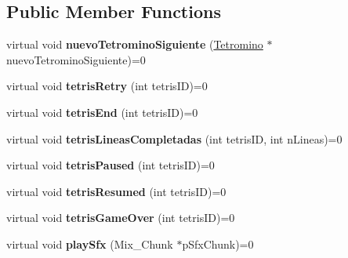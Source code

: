 \subsection*{Public Member Functions}
\begin{DoxyCompactItemize}
\item 
virtual void {\bfseries nuevo\+Tetromino\+Siguiente} (\hyperlink{class_tetromino}{Tetromino} $\ast$nuevo\+Tetromino\+Siguiente)=0\hypertarget{class_interfaz_juego_tetris_a9b27aa0041ec81b9c4dda8539fe21385}{}\label{class_interfaz_juego_tetris_a9b27aa0041ec81b9c4dda8539fe21385}

\item 
virtual void {\bfseries tetris\+Retry} (int tetris\+ID)=0\hypertarget{class_interfaz_juego_tetris_a8fd933b642725742a4f5d9b035e0f8ec}{}\label{class_interfaz_juego_tetris_a8fd933b642725742a4f5d9b035e0f8ec}

\item 
virtual void {\bfseries tetris\+End} (int tetris\+ID)=0\hypertarget{class_interfaz_juego_tetris_aee4fc00412f8d4dfffd5f580ab8e0817}{}\label{class_interfaz_juego_tetris_aee4fc00412f8d4dfffd5f580ab8e0817}

\item 
virtual void {\bfseries tetris\+Lineas\+Completadas} (int tetris\+ID, int n\+Lineas)=0\hypertarget{class_interfaz_juego_tetris_a9e11a199a7615f034d8be30eeedc6f68}{}\label{class_interfaz_juego_tetris_a9e11a199a7615f034d8be30eeedc6f68}

\item 
virtual void {\bfseries tetris\+Paused} (int tetris\+ID)=0\hypertarget{class_interfaz_juego_tetris_ad5370760fceffca5e71a9ed651baf9d5}{}\label{class_interfaz_juego_tetris_ad5370760fceffca5e71a9ed651baf9d5}

\item 
virtual void {\bfseries tetris\+Resumed} (int tetris\+ID)=0\hypertarget{class_interfaz_juego_tetris_a45260ee6da54129577ea96795f506444}{}\label{class_interfaz_juego_tetris_a45260ee6da54129577ea96795f506444}

\item 
virtual void {\bfseries tetris\+Game\+Over} (int tetris\+ID)=0\hypertarget{class_interfaz_juego_tetris_aa2ceb116d7d8be58bc924ea2e96602d4}{}\label{class_interfaz_juego_tetris_aa2ceb116d7d8be58bc924ea2e96602d4}

\item 
virtual void {\bfseries play\+Sfx} (Mix\+\_\+\+Chunk $\ast$p\+Sfx\+Chunk)=0\hypertarget{class_interfaz_juego_tetris_a34572732b0e83f406322e268e3776906}{}\label{class_interfaz_juego_tetris_a34572732b0e83f406322e268e3776906}


\end{DoxyCompactItemize}
